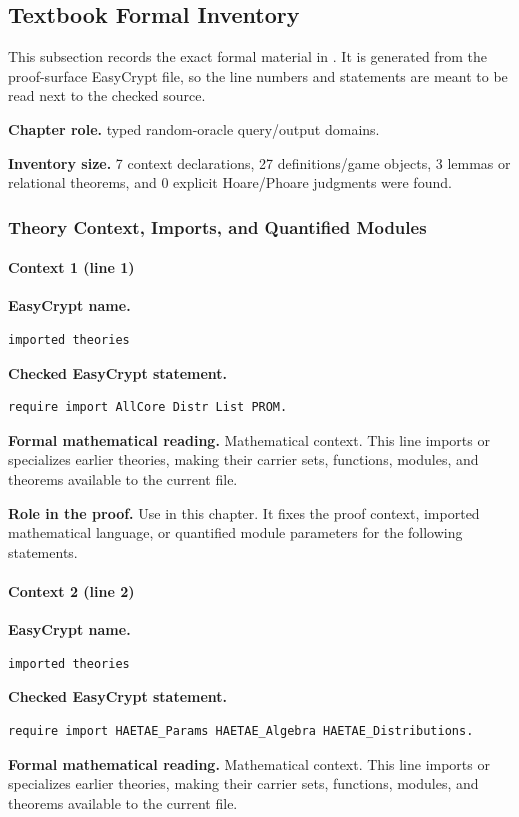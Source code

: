 \subsection*{Textbook Formal Inventory}
This subsection records the exact formal material in .  It is generated from the proof-surface EasyCrypt file, so the line numbers and statements are meant to be read next to the checked source.

\noindent\textbf{Chapter role.} typed random-oracle query/output domains.

\noindent\textbf{Inventory size.} 7 context declarations, 27 definitions/game objects, 3 lemmas or relational theorems, and 0 explicit Hoare/Phoare judgments were found.

\subsubsection*{Theory Context, Imports, and Quantified Modules}
\paragraph{Context 1 (line 1)}
\noindent\textbf{EasyCrypt name.}
\begin{lstlisting}[language=EasyCrypt,basicstyle=\ttfamily\scriptsize]
imported theories
\end{lstlisting}
\noindent\textbf{Checked EasyCrypt statement.}
\begin{lstlisting}[language=EasyCrypt,basicstyle=\ttfamily\scriptsize]
require import AllCore Distr List PROM.
\end{lstlisting}
\noindent\textbf{Formal mathematical reading.}
Mathematical context. This line imports or specializes earlier theories, making their carrier sets, functions, modules, and theorems available to the current file.

\noindent\textbf{Role in the proof.}
Use in this chapter. It fixes the proof context, imported mathematical language, or quantified module parameters for the following statements.

\paragraph{Context 2 (line 2)}
\noindent\textbf{EasyCrypt name.}
\begin{lstlisting}[language=EasyCrypt,basicstyle=\ttfamily\scriptsize]
imported theories
\end{lstlisting}
\noindent\textbf{Checked EasyCrypt statement.}
\begin{lstlisting}[language=EasyCrypt,basicstyle=\ttfamily\scriptsize]
require import HAETAE_Params HAETAE_Algebra HAETAE_Distributions.
\end{lstlisting}
\noindent\textbf{Formal mathematical reading.}
Mathematical context. This line imports or specializes earlier theories, making their carrier sets, functions, modules, and theorems available to the current file.

